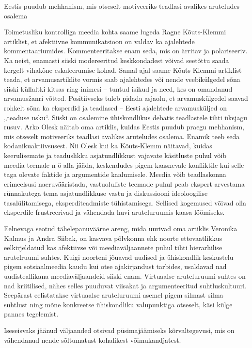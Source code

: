 \documentclass[estonian,]{article}
\begin{document}
\begin{blockquote-left}
Eestis puudub mehhanism, mis otseselt motiveeriks teadlasi avalikes
aruteludes osalema
\end{blockquote-left}

Toimetusliku kontrolliga meedia kohta saame lugeda Ragne Kõuts-Klemmi artiklist, et afektiivne kommunikatsioon on valdav ka ajalehtede kommentaariumides. Kommenteeritakse enam seda, mis on ärritav ja polariseeriv. Ka neist, enamasti siiski modereeritud keskkondadest võivad seetõttu saada kergelt vihakõne eskaleerumise kohad. Samal ajal saame Kõuts-Klemmi artiklist teada, et arvamusartiklite vormis saab ajalehtedes või nende veebikülgedel sõna siiski küllaltki kitsas ring inimesi -- tuntud isikud ja need, kes on omandanud arvamusžanri võtted. Positiivseks tuleb pidada asjaolu, et arvamuskülgedel saavad rohkelt sõna ka eksperdid ja teadlased -- Eesti ajalehtede arvamusküljed on „teaduse usku``. Siiski on osalemine ühiskondlikus debatis teadlastele tihti üksjagu rusuv. Arko Olesk näitab oma artiklis, kuidas Eestis puudub praegu mehhanism, mis otseselt motiveeriks teadlasi avalikes aruteludes osalema. Enamik teeb seda kodanikuaktiivsusest. Nii Olesk kui ka Kõuts-Klemm näitavad, kuidas keerulisemate ja teaduslikku asjatundlikkust vajavate käsitluste puhul võib meedia teemale n-ö alla jääda, keskendudes pigem kaasnevale konfliktile kui selle taga olevate faktide ja argumentide kaalumisele. Meedia võib teadlaskonna erimeelsusi naeruvääristada, vastuoluliste teemade puhul peab ekspert arvestama rünnakutega tema asjatundlikkuse vastu ja diskussiooni ideoloogilise tasalülitamisega, eksperditeadmiste tühistamisega. Sellised kogemused võivad olla eksperdile frustreerivad ja vähendada huvi aruteluruumis kaasa löömiseks.

Eelnevaga seotud tähelepanuväärne areng, mida uurivad oma artiklis Veronika Kalmus ja Andra Siibak, on kasvava põlvkonna ehk noorte ettevaatlikkus eelkirjeldatud kas afektiivse või meediaväljaannete puhul tihti hierarhilise arutelruumi suhtes. Kuigi noorteni jõuavad uudised ja ühiskondlik keskustelu pigem sotsiaalmeedia kaudu kui otse ajakirjandust tarbides, usaldavad nad uudisteallikana meediaväljaandeid siiski enam. Virtuaalse aruteluruumi suhtes on nad kriitilised, nähes selles puuduvat viisakat ja argumenteeritud suhtluskultuuri. Seepärast eelistatakse virtuaalse aruteluruumi asemel pigem silmast silma suhtlust ning mõne konkreetse ühiskondliku valupunktiga otseselt, käsi külge pannes tegelemist.

\begin{blockquote-right}
Iseseisvaks jäänud väljaanded otsivad püsimajäämiseks kõrvaltegevusi,
mis on vähendanud nende sõltumatust kohalikest võimukandjatest.
\end{blockquote-right}
\end{document}
